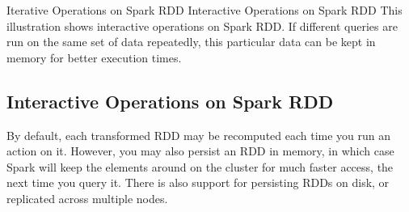 \documentclass[a4paper,12pt]{article}
\begin{document}
Iterative Operations on Spark RDD
Interactive Operations on Spark RDD
This illustration shows interactive operations on Spark RDD. If different queries are run on the same set of data repeatedly, this particular data can be kept in memory for better execution times.

\subsection*{Interactive Operations on Spark RDD}
By default, each transformed RDD may be recomputed each time you run an action on it. However, you may also persist an RDD in memory, in which case Spark will keep the elements around on the cluster for much faster access, the next time you query it. There is also support for persisting RDDs on disk, or replicated across multiple nodes.
\end{document}
